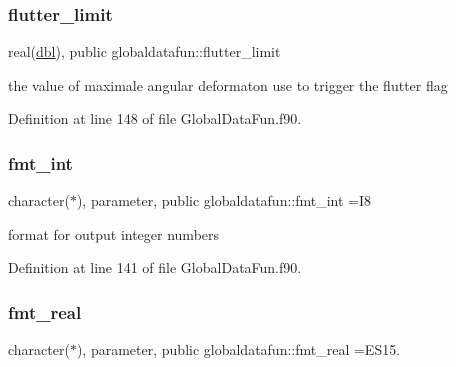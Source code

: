\mbox{\label{namespaceglobaldatafun_a00437dc044a340393bafc8c15d696e7a}} 
\subsubsection{\texorpdfstring{flutter\+\_\+limit}{flutter\_limit}}
{\footnotesize\ttfamily real(\hyperlink{namespaceglobaldatafun_a5008801201dd34f2af8eae07756befb4}{dbl}), public globaldatafun\+::flutter\+\_\+limit}



the value of maximale angular deformaton use to trigger the flutter flag 



Definition at line 148 of file Global\+Data\+Fun.\+f90.

\mbox{\label{namespaceglobaldatafun_a9636e338fbbaf3b710c9483f5ba825ad}} 
\subsubsection{\texorpdfstring{fmt\+\_\+int}{fmt\_int}}
{\footnotesize\ttfamily character($\ast$), parameter, public globaldatafun\+::fmt\+\_\+int =\textquotesingle{}I8\textquotesingle{}}



format for output integer numbers 



Definition at line 141 of file Global\+Data\+Fun.\+f90.

\mbox{\label{namespaceglobaldatafun_ab9b7950cc6b98bba6c90ccbc0bf16763}} 
\subsubsection{\texorpdfstring{fmt\+\_\+real}{fmt\_real}}
{\footnotesize\ttfamily character($\ast$), parameter, public globaldatafun\+::fmt\+\_\+real =\textquotesingle{}E\+S15.\textquotesingle{}}



